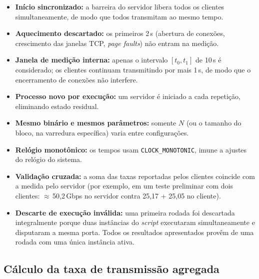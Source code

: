 \documentclass[12pt,a4paper]{article}
\newcommand{\SI}[2]{\mbox{#1\,#2}}
\begin{document}
\begin{itemize}
  \item \textbf{Início sincronizado:} a barreira do servidor libera todos os
  clientes simultaneamente, de modo que todos transmitam ao mesmo tempo.
  \item \textbf{Aquecimento descartado:} os primeiros \SI{2}{s} (abertura de
  conexões, crescimento das janelas TCP, \textit{page faults}) não entram na
  medição.
  \item \textbf{Janela de medição interna:} apenas o intervalo
  $[t_0,t_1]$ de \SI{10}{s} é considerado; os clientes continuam transmitindo
  por mais \SI{1}{s}, de modo que o encerramento de conexões não interfere.
  \item \textbf{Processo novo por execução:} um servidor é iniciado a cada
  repetição, eliminando estado residual.
  \item \textbf{Mesmo binário e mesmos parâmetros:} somente $N$ (ou o tamanho do
  bloco, na varredura específica) varia entre configurações.
  \item \textbf{Relógio monotônico:} os tempos usam
  \texttt{CLOCK\_MONOTONIC}, imune a ajustes do relógio do sistema.
  \item \textbf{Validação cruzada:} a soma das taxas reportadas pelos clientes
  coincide com a medida pelo servidor (por exemplo, em um teste preliminar
  com dois clientes: $\approx$\,\SI{50{,}2}{Gbps} no servidor contra
  25,17 + 25,05 no cliente).
  \item \textbf{Descarte de execução inválida:} uma primeira rodada foi
  descartada integralmente porque duas instâncias do \textit{script}
  executaram simultaneamente e disputaram a mesma porta. Todos os resultados
  apresentados provêm de uma rodada com uma única instância ativa.
\end{itemize}

\subsection{Cálculo da taxa de transmissão agregada}
\end{document}
